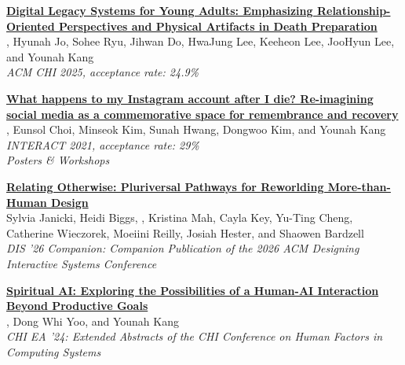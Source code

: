 {\vspace{-0.25cm}

\hangindent=0.83cm\noindent[C.2] \href{https://dl.acm.org/doi/abs/10.1145/3706598.3713764}{\textbf{Digital Legacy Systems for Young Adults: Emphasizing Relationship-Oriented Perspectives and Physical Artifacts in Death Preparation}} \\
, Hyunah Jo, Sohee Ryu, Jihwan Do, HwaJung Lee, Keeheon Lee, JooHyun Lee, and Younah Kang \\ 
\textit{ACM CHI 2025, acceptance rate: 24.9\% }\\ 

\vspace{-0.25cm}

\pagebreak

\hangindent=0.83cm\noindent[C.1] 
\href{https://doi.org/10.1007/978-3-030-85616-8_26}
{\textbf{What happens to my Instagram account after I die? Re-imagining social media as a commemorative space for remembrance and recovery}} \\
, Eunsol Choi, Minseok Kim, Sunah Hwang, Dongwoo Kim, and Younah Kang \\
\textit{INTERACT 2021, acceptance rate: 29\%} \\

\noindent \textit{Posters \& Workshops}\\
\vspace{-0.25cm}

\hangindent=0.83cm\noindent[P.2]
\href{https://doi.org/10.1145/3802974.3808002}{\textbf{Relating Otherwise: Pluriversal Pathways for Reworlding More-than-Human Design}} \\
Sylvia Janicki, Heidi Biggs, , Kristina Mah, Cayla Key, Yu-Ting Cheng, Catherine Wieczorek, Moeiini Reilly, Josiah Hester, and Shaowen Bardzell\\
\textit{DIS '26 Companion: Companion Publication of the 2026 ACM Designing Interactive Systems Conference} \\

\vspace{-0.25cm}

\hangindent=0.83cm\noindent[P.1]
\href{https://dl.acm.org/doi/abs/10.1145/3613905.3650743}
{\textbf{Spiritual AI: Exploring the Possibilities of a Human-AI Interaction Beyond Productive Goals}} \\
, Dong Whi Yoo, and Younah Kang \\
\textit{CHI EA '24: Extended Abstracts of the CHI Conference on Human Factors in Computing Systems} \\


}
